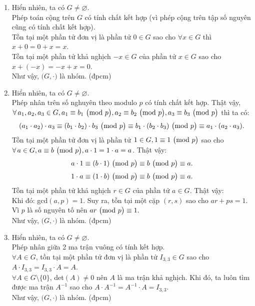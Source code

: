 \justifying
\begin{enumerate}[label=\alph*.]
    \item Hiển nhiên, ta có $G \neq \varnothing$.\\
    Phép toán cộng trên $G$ có tính chất kết hợp (vì phép cộng trên tập số nguyên cũng có tính chất kết hợp).\\
    Tồn tại một phần tử đơn vị là phần tử $0 \in G$ sao cho $\forall x \in G$ thì $x + 0 = 0 + x = x$.\\
    Tồn tại một phần tử khả nghịch $-x \in G$ của phần tử $x \in G$ sao cho $x + (-x) = -x + x = 0$.\\
    Như vậy, $\big( G, \cdot \big)$ là nhóm. (đpcm)

    \item Hiển nhiên, ta có $G \neq \varnothing$.\\
    Phép nhân trên số nghuyên theo modulo $p$ có tính chất kết hợp. Thật vậy, $\forall a_1, a_2, a_3 \in G, a_1 \equiv b_1 \Mod{p}, a_2 \equiv b_2 \Mod{p}, a_3 \equiv b_3 \Mod{p}$ thì ta có:
    $$(a_1 \cdot a_2) \cdot a_3 \equiv (b_1 \cdot b_2) \cdot b_3 \ \big( \mathrm{mod}\ p \big) \equiv b_1 \cdot (b_2 \cdot b_3) \ \big( \mathrm{mod}\ p \big) \equiv a_1 \cdot (a_2 \cdot a_3).$$
    Tồn tại một phần tử đơn vị là phần tử $1 \in G, 1 \equiv 1 \ \big( \mathrm{mod}\ p \big)$ sao cho $\forall a \in G, a \equiv b \Mod{p}, a \cdot 1 = 1 \cdot a = a$. Thật vậy:
    $$a \cdot 1 \equiv (b \cdot 1) \ \big( \mathrm{mod}\ p \big) \equiv b \ \big( \mathrm{mod}\ p \big) \equiv a.$$
    $$1 \cdot a \equiv (1 \cdot b) \ \big( \mathrm{mod}\ p \big) \equiv b \ \big( \mathrm{mod}\ p \big) \equiv a.$$
    Tồn tại một phần tử khả nghịch $r \in G$ của phần tử $a \in G$. Thật vậy:\\
    Khi đó: gcd$(a, p) = 1$. Suy ra, tồn tại một cặp $(r, s)$ sao cho $ar + ps = 1$. Vì $p$ là số nguyên tố nên $a r \ \big( \mathrm{mod}\ p \big) \equiv 1.$\\
    Như vậy, $\big( G, \cdot \big)$ là nhóm. (đpcm)

    \item Hiển nhiên, ta có $G \neq \varnothing$.\\
    Phép nhân giữa 2 ma trận vuông có tính kết hợp.\\
    $\forall A \in G$, tồn tại một phần tử đơn vị là phần tử $I_{3,3} \in G$ sao cho $A \cdot I_{3,3} = I_{3,3} \cdot A = A$.\\
    $\forall A \in G \setminus \{0\}$, det$(A) \neq 0$ nên $A$ là ma trận khả nghịch. Khi đó, ta luôn tìm được ma trận $A^{-1}$ sao cho $A \cdot A^{-1} = A^{-1} \cdot A = I_{3,3}$.\\
    Như vậy, $\big( G, \cdot \big)$ là nhóm. (đpcm)
    
\end{enumerate}


	
\clearpage